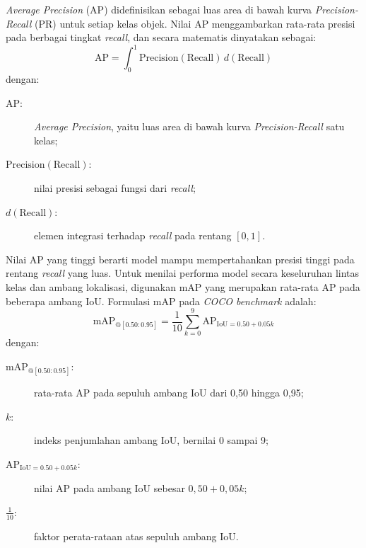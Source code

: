 \textit{Average Precision} (AP) didefinisikan sebagai luas area di bawah kurva
\textit{Precision-Recall} (PR) untuk setiap kelas objek. Nilai AP
menggambarkan rata-rata presisi pada berbagai tingkat \textit{recall}, dan
secara matematis dinyatakan sebagai:
\begin{equation}
\text{AP} = \int_{0}^{1} \text{Precision}(\text{Recall}) \, d(\text{Recall})
\end{equation}
\noindent dengan:
\begin{description}
  \item[$\text{AP}$:] \textit{Average Precision}, yaitu luas area di bawah kurva \textit{Precision-Recall} satu kelas;
  \item[$\text{Precision}(\text{Recall})$:] nilai presisi sebagai fungsi dari \textit{recall};
  \item[$d(\text{Recall})$:] elemen integrasi terhadap \textit{recall} pada rentang $[0,1]$.
\end{description}
Nilai AP yang tinggi berarti model mampu mempertahankan presisi
tinggi pada rentang \textit{recall} yang luas. Untuk menilai performa model
secara keseluruhan lintas kelas dan ambang lokalisasi, digunakan mAP yang
merupakan rata-rata AP pada beberapa ambang IoU. Formulasi mAP pada
\textit{COCO benchmark} adalah:
\begin{equation}
\text{mAP}_{@[0.50:0.95]} = \frac{1}{10} \sum_{k=0}^{9} \text{AP}_{\text{IoU} = 0.50 + 0.05k}
\end{equation}
\noindent dengan:
\begin{description}
  \item[$\text{mAP}_{@[0.50:0.95]}$:] rata-rata AP pada sepuluh ambang IoU dari 0{,}50 hingga 0{,}95;
  \item[$k$:] indeks penjumlahan ambang IoU, bernilai 0 sampai 9;
  \item[$\text{AP}_{\text{IoU} = 0.50 + 0.05k}$:] nilai AP pada ambang IoU sebesar $0{,}50 + 0{,}05k$;
  \item[$\tfrac{1}{10}$:] faktor perata-rataan atas sepuluh ambang IoU.
\end{description}

